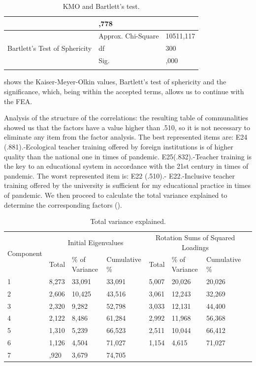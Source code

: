 \documentclass[english]{textolivre}
\begin{document}
\begin{table}[htpb]
\caption{KMO and Bartlett's test.}
\label{tab2}
\centering
\begin{tabular}{p{}p{}p{}}
\toprule 
\arrayrulecolor[gray]{.7}
\multicolumn{2}{c}{Kaiser-Meyer-Olkin Measure of Sampling Adequacy.} & ,778
\\ 
\midrule
\multirow{3}{*}{Bartlett's Test of Sphericity} & Approx. Chi-Square & 10511,117 \\
\cmidrule{2-3}
& df & 300 \\
\cmidrule{2-3}
& Sig. & ,000
\\
\arrayrulecolor{black}
\bottomrule
\end{tabular}
\centering
\end{table}

 shows the Kaiser-Meyer-Olkin values, Bartlett's test of sphericity and the significance, which, being within the accepted terms, allows us to continue with the FEA.
 
Analysis of the structure of the correlations: the resulting table of communalities showed us that the factors have a value higher than .510, so it is not necessary to eliminate any item from the factor analysis. The best represented items are: E24 (.881).-Ecological teacher training offered by foreign institutions is of higher quality than the national one in times of pandemic.
E25(.832).-Teacher training is the key to an educational system in accordance with the 21st century in times of pandemic. The worst represented item is: E22 (.510).- E22.-Inclusive teacher training offered by the university is sufficient for my educational practice in times of pandemic. We then proceed to calculate the total variance explained to determine the corresponding factors ().

\begin{table}[htpb]
\caption{Total variance explained.}
\label{tab3}
\centering
\begin{tabular}{p{}lllllll}
\toprule 
\multirow{2}{*}{Component} & \multicolumn{3}{c}{Initial Eigenvalues} & \multicolumn{3}{c}{Rotation Sums of Squared Loadings} \\ 
\cmidrule{2-4} \cmidrule{5-7}
& Total & \% of Variance & Cumulative \% & Total & \% of Variance & Cumulative \%
\\
\midrule
1 & 8,273 & 33,091 & 33,091 & 5,007 & 20,026 & 20,026 \\
2 & 2,606 & 10,425 & 43,516 & 3,061 & 12,243 & 32,269 \\
3 & 2,320 & 9,282 & 52,798 & 3,033 & 12,131 & 44,400 \\
4 & 2,122 & 8,486 & 61,284 & 2,992 & 11,968 & 56,368 \\
5 & 1,310 & 5,239 & 66,523 & 2,511 & 10,044 & 66,412 \\
6 & 1,126 & 4,504 & 71,027 & 1,154 & 4,615 & 71,027 \\
7 & ,920 & 3,679 & 74,705 & & & \\
\bottomrule
\end{tabular}
\centering
\end{table}
\end{document}
